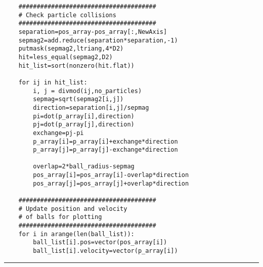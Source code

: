 \documentclass[a4]{article}
\begin{document}
{\begin{verbatim}
    ######################################
    # Check particle collisions
    ######################################
    separation=pos_array-pos_array[:,NewAxis]
    sepmag2=add.reduce(separation*separation,-1)
    putmask(sepmag2,ltriang,4*D2)
    hit=less_equal(sepmag2,D2)
    hit_list=sort(nonzero(hit.flat))

    for ij in hit_list:
        i, j = divmod(ij,no_particles)
        sepmag=sqrt(sepmag2[i,j])
        direction=separation[i,j]/sepmag
        pi=dot(p_array[i],direction)
        pj=dot(p_array[j],direction)
        exchange=pj-pi
        p_array[i]=p_array[i]+exchange*direction
        p_array[j]=p_array[j]-exchange*direction

        overlap=2*ball_radius-sepmag
        pos_array[i]=pos_array[i]-overlap*direction
        pos_array[j]=pos_array[j]+overlap*direction

    ######################################
    # Update position and velocity
    # of balls for plotting
    ######################################
    for i in arange(len(ball_list)):
        ball_list[i].pos=vector(pos_array[i])
        ball_list[i].velocity=vector(p_array[i])

\end{verbatim}\hrule}

\end{document}
